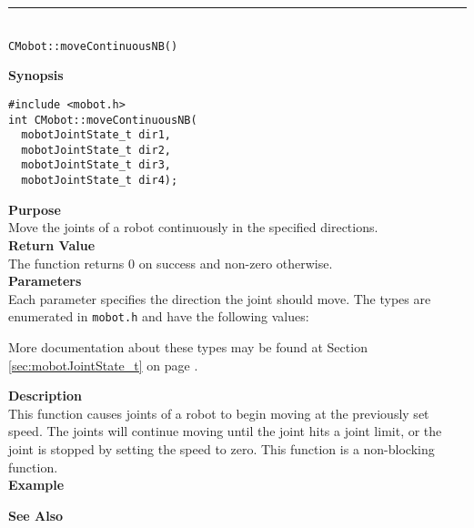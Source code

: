 \noindent
\vspace{5pt}
\rule{4.5in}{0.015in}\\
\noindent
{\LARGE \texttt{CMobot::moveContinuousNB()}}\\
{}

\noindent
{\bf Synopsis}
\vspace{-8pt}
\begin{verbatim}
#include <mobot.h>
int CMobot::moveContinuousNB(
  mobotJointState_t dir1, 
  mobotJointState_t dir2, 
  mobotJointState_t dir3, 
  mobotJointState_t dir4);
\end{verbatim}

\noindent
{\bf Purpose}\\
Move the joints of a robot continuously in the specified directions.\\

\noindent
{\bf Return Value}\\
The function returns 0 on success and non-zero otherwise.\\

\noindent
{\bf Parameters}\\
Each parameter specifies the direction the joint should move. The types
are enumerated in \texttt{mobot.h} and have the following values:

More documentation about these types may be found at Section
\ref{sec:mobotJointState_t} on page
\pageref{sec:mobotJointState_t}.

\noindent
{\bf Description}\\
This function causes joints of a robot to begin moving at the previously set
speed. The joints will continue moving until the joint hits a joint limit, or
the joint is stopped by setting the speed to zero. This function is a non-blocking
function.\\

\noindent
{\bf Example}\\
\noindent

\noindent
{\bf See Also}\\

